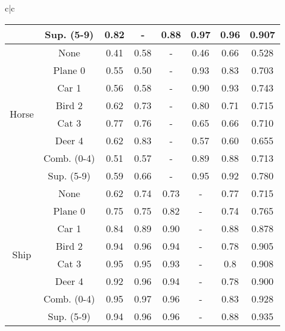 \documentclass[acmtog, nonacm]{acmart}
\begin{document}
\begin{tabular}{c|c}
\begin{tabular}{@{}c|c|ccccc|c@{}}
                       & Sup. (5-9)                & 0.82 & -    & 0.88  & 0.97 & 0.96  & 0.907                \\
\midrule
\multirow{8}{*}{Horse} & None                      & 0.41 & 0.58 & -     & 0.46 & 0.66  & 0.528                \\
                       & Plane 0                   & 0.55 & 0.50 & -     & 0.93 & 0.83  & 0.703                \\
                       & Car 1                     & 0.56 & 0.58 & -     & 0.90 & 0.93  & 0.743                \\
                       & Bird 2                    & 0.62 & 0.73 & -     & 0.80 & 0.71  & 0.715                \\
                       & Cat 3                     & 0.77 & 0.76 & -     & 0.65 & 0.66  & 0.710                \\
                       & Deer 4                    & 0.62 & 0.83 & -     & 0.57 & 0.60  & 0.655                \\
                       & Comb. (0-4)               & 0.51 & 0.57 & -     & 0.89 & 0.88  & 0.713                \\
                       & Sup. (5-9)                & 0.59 & 0.66 & -     & 0.95 & 0.92  & 0.780                \\
\midrule
\multirow{8}{*}{Ship}  & None                      & 0.62 & 0.74 & 0.73  & -    & 0.77  & 0.715                \\
                       & Plane 0                   & 0.75 & 0.75 & 0.82  & -    & 0.74  & 0.765                \\
                       & Car 1                     & 0.84 & 0.89 & 0.90  & -    & 0.88  & 0.878                \\
                       & Bird 2                    & 0.94 & 0.96 & 0.94  & -    & 0.78  & 0.905                \\
                       & Cat 3                     & 0.95 & 0.95 & 0.93  & -    & 0.8   & 0.908                \\
                       & Deer 4                    & 0.92 & 0.96 & 0.94  & -    & 0.78  & 0.900                \\
                       & Comb. (0-4)               & 0.95 & 0.97 & 0.96  & -    & 0.83  & 0.928                \\
                       & Sup. (5-9)                & 0.94 & 0.96 & 0.96  & -    & 0.88  & 0.935                \\

\end{tabular}
\end{tabular}
\end{document}

